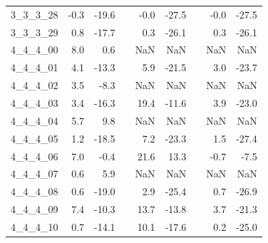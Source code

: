 \begin{longtable}{lrrcrrcrr}
3\_3\_3\_28      &                -0.3 &                 -19.6 &&                 -0.0 &                  -27.5 &&                 -0.0 &                  -27.5 \\
3\_3\_3\_29      &                 0.8 &                 -17.7 &&                  0.3 &                  -26.1 &&                  0.3 &                  -26.1 \\
4\_4\_4\_00      &                 8.0 &                   0.6 &&                  NaN &                    NaN &&                  NaN &                    NaN \\
4\_4\_4\_01      &                 4.1 &                 -13.3 &&                  5.9 &                  -21.5 &&                  3.0 &                  -23.7 \\
4\_4\_4\_02      &                 3.5 &                  -8.3 &&                  NaN &                    NaN &&                  NaN &                    NaN \\
4\_4\_4\_03      &                 3.4 &                 -16.3 &&                 19.4 &                  -11.6 &&                  3.9 &                  -23.0 \\
4\_4\_4\_04      &                 5.7 &                   9.8 &&                  NaN &                    NaN &&                  NaN &                    NaN \\
4\_4\_4\_05      &                 1.2 &                 -18.5 &&                  7.2 &                  -23.3 &&                  1.5 &                  -27.4 \\
4\_4\_4\_06      &                 7.0 &                  -0.4 &&                 21.6 &                   13.3 &&                 -0.7 &                   -7.5 \\
4\_4\_4\_07      &                 0.6 &                   5.9 &&                  NaN &                    NaN &&                  NaN &                    NaN \\
4\_4\_4\_08      &                 0.6 &                 -19.0 &&                  2.9 &                  -25.4 &&                  0.7 &                  -26.9 \\
4\_4\_4\_09      &                 7.4 &                 -10.3 &&                 13.7 &                  -13.8 &&                  3.7 &                  -21.3 \\
4\_4\_4\_10      &                 0.7 &                 -14.1 &&                 10.1 &                  -17.6 &&                  0.2 &                  -25.0 \\

\end{longtable}

